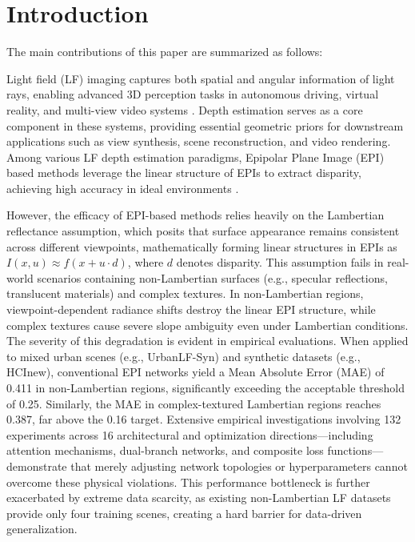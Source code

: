 \section{Introduction}

The main contributions of this paper are summarized as follows:

Light field (LF) imaging captures both spatial and angular information of light rays, enabling advanced 3D perception tasks in autonomous driving, virtual reality, and multi-view video systems . Depth estimation serves as a core component in these systems, providing essential geometric priors for downstream applications such as view synthesis, scene reconstruction, and video rendering. Among various LF depth estimation paradigms, Epipolar Plane Image (EPI) based methods leverage the linear structure of EPIs to extract disparity, achieving high accuracy in ideal environments .

However, the efficacy of EPI-based methods relies heavily on the Lambertian reflectance assumption, which posits that surface appearance remains consistent across different viewpoints, mathematically forming linear structures in EPIs as $I(x, u) \approx f(x + u \cdot d)$, where $d$ denotes disparity. This assumption fails in real-world scenarios containing non-Lambertian surfaces (e.g., specular reflections, translucent materials) and complex textures. In non-Lambertian regions, viewpoint-dependent radiance shifts destroy the linear EPI structure, while complex textures cause severe slope ambiguity even under Lambertian conditions. The severity of this degradation is evident in empirical evaluations. When applied to mixed urban scenes (e.g., UrbanLF-Syn) and synthetic datasets (e.g., HCInew), conventional EPI networks yield a Mean Absolute Error (MAE) of 0.411 in non-Lambertian regions, significantly exceeding the acceptable threshold of 0.25. Similarly, the MAE in complex-textured Lambertian regions reaches 0.387, far above the 0.16 target. Extensive empirical investigations involving 132 experiments across 16 architectural and optimization directions—including attention mechanisms, dual-branch networks, and composite loss functions—demonstrate that merely adjusting network topologies or hyperparameters cannot overcome these physical violations. This performance bottleneck is further exacerbated by extreme data scarcity, as existing non-Lambertian LF datasets provide only four training scenes, creating a hard barrier for data-driven generalization.


